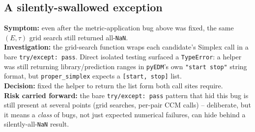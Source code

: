 \documentclass[11pt]{article}
\begin{document}
\subsection{A silently-swallowed exception}
\textbf{Symptom:} even after the metric-application bug above was fixed, the same $(E,\tau)$ grid search still returned all-\texttt{NaN}.\\
\textbf{Investigation:} the grid-search function wraps each candidate's Simplex call in a bare \texttt{try/except: pass}. Direct isolated testing surfaced a \texttt{TypeError}: a helper was still returning library/prediction ranges in \texttt{pyEDM}'s own \texttt{"start stop"} string format, but \texttt{proper\_simplex} expects a \texttt{[start, stop]} list.\\
\textbf{Decision:} fixed the helper to return the list form both call sites require.\\
\textbf{Risk carried forward:} the bare \texttt{try/except: pass} pattern that hid this bug is still present at several points (grid searches, per-pair CCM calls) -- deliberate, but it means a \emph{class} of bugs, not just expected numerical failures, can hide behind a silently-all-\texttt{NaN} result.
\end{document}
